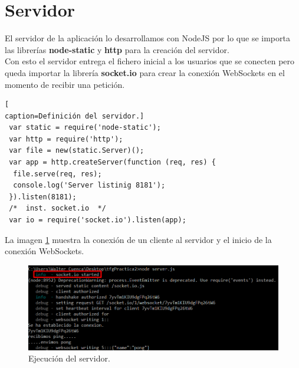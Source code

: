 \section{Servidor}
El servidor de la aplicación lo desarrollamos con NodeJS por lo que se importa las librerías \textbf{node-static} y \textbf{http} para la creación del servidor.
\\Con esto el servidor entrega el fichero inicial a los usuarios que se conecten pero queda importar la librería \textbf{socket.io} para crear la conexión WebSockets en el momento de recibir una petición.
\begin{lstlisting}[
caption=Definición del servidor.]
 var static = require('node-static');
 var http = require('http');
 var file = new(static.Server)();
 var app = http.createServer(function (req, res) {
  file.serve(req, res);
  console.log('Server listinig 8181');
 }).listen(8181);
 /*  inst. socket.io  */
 var io = require('socket.io').listen(app);
\end{lstlisting}
La imagen \ref{fig:EjecucionServer} muestra la conexión de un cliente al servidor y el inicio de la conexión WebSockets.
\begin{figure}[!h]
\begin{center}
  \includegraphics[width=0.7\linewidth]{Figures/Init_Server}
	\decoRule
	\caption[Ejecución del servidor]{Ejecución del servidor.}
\label{fig:EjecucionServer}
\end{center}
\end{figure}
